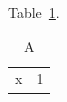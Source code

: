 Table~\ref{tab:a}. \begin{table}\caption{A}\label{tab:a}\begin{tabular}{lr}x&1\\\end{tabular}\end{table}